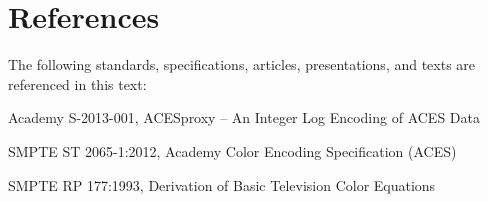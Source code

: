 \numberedformat
\chapter{References}
The following standards, specifications, articles, presentations, and texts are referenced in this text:

Academy S-2013-001, ACESproxy -- An Integer Log Encoding of ACES Data

SMPTE ST 2065-1:2012, Academy Color Encoding Specification (ACES)

SMPTE RP 177:1993, Derivation of Basic Television Color Equations
